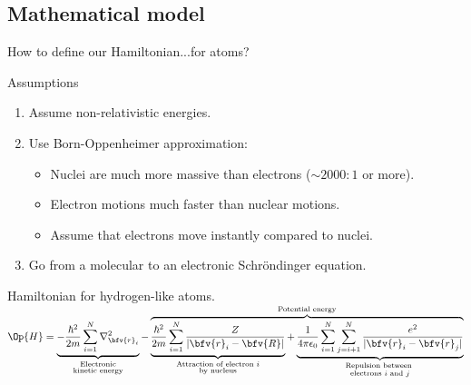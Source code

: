 \subsection{Mathematical model}
\begin{frame}{How to define our Hamiltonian...for atoms?}
	\begin{scriptsize}
	\begin{alertblock}{Assumptions}
		\begin{enumerate}
		
			\item Assume non-relativistic energies.
			
			\item Use Born-Oppenheimer approximation:
				\begin{itemize}
					\scriptsize
					\item Nuclei are much more massive than electrons ($\sim 2000:1$ or more).
					\item Electron motions much faster than nuclear motions.
					\item Assume that electrons move instantly compared to nuclei.
				\end{itemize}
				
			\item Go from a molecular to an electronic Schr\"ondinger equation.
		\end{enumerate}
	\end{alertblock}
	
	\begin{alertblock}{Hamiltonian for hydrogen-like atoms.}
		\centering
		$\Op{H} = \underbrace{- \frac{\hbar^ 2}{2m} \sum_{i=1}^ {N} \nabla_{\bfv{r}_i}^{2}}_{\begin{smallmatrix}\text{Electronic}\\\text{kinetic energy}\end{smallmatrix}}  - \overbrace{\underbrace{\frac{\hbar^2}{2m} \sum_{i=1}^{N}\frac{Z}{|\bfv{r}_i - \bfv{R}|}}_{\begin{smallmatrix}\text{Attraction of electron $i$}\\\text{by nucleus}\end{smallmatrix}}  + \underbrace{\frac{1}{4 \pi \epsilon_0} \sum_{i=1}^{N} \sum_{j=i+1}^{N}\frac{e^2}{|\bfv{r}_i - \bfv{r}_j|}}_{\begin{smallmatrix}\text{Repulsion between }\\\text{electrons $i$ and $j$}\end{smallmatrix}}}^{\text{Potential energy}}$
	\end{alertblock}
	\end{scriptsize}
\end{frame}

